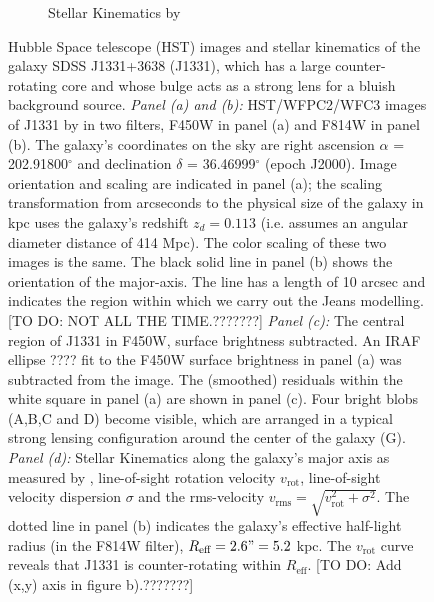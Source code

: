 \begin{figure}
\begin{subfigure}{.5\textwidth}
  \caption{Stellar Kinematics by \citet{SWELLSV}}
  \label{fig:kinematics}
\end{subfigure}
\caption{Hubble Space telescope (HST) images and stellar kinematics of the galaxy SDSS J1331+3638 (J1331), which has a large counter-rotating core and whose bulge acts as a strong lens for a bluish background source. \emph{Panel (a) and (b):} HST/WFPC2/WFC3 images of J1331 by \citet{SWELLSI} in two filters, F450W in panel (a) and F814W in panel (b). The galaxy's coordinates on the sky are right ascension $\alpha$ = 202.91800$^\circ$ and declination $\delta$ = 36.46999$^\circ$ (epoch J2000). Image orientation and scaling are indicated in panel (a); the scaling transformation from arcseconds to the physical size of the galaxy in kpc uses the galaxy's redshift $z_d = 0.113$ \citep{SWELLSIII} (i.e. assumes an angular diameter distance of 414 Mpc). The color scaling of these two images is the same. The black solid line in panel (b) shows the orientation of the major-axis. The line has a length of 10 arcsec and indicates the region within which we carry out the Jeans modelling. [TO DO: NOT ALL THE TIME.???????] \emph{Panel (c):} The central region of J1331 in F450W, surface brightness subtracted. An IRAF ellipse ???? fit to the F450W surface brightness in panel (a) was subtracted from the image. The (smoothed) residuals within the white square in panel (a) are shown in panel (c). Four bright blobs (A,B,C and D) become visible, which are arranged in a typical strong lensing configuration around the center of the galaxy (G). \emph{Panel (d):} Stellar Kinematics along the galaxy's major axis as measured by \citet{SWELLSV}, line-of-sight rotation velocity $v_\text{rot}$, line-of-sight velocity dispersion $\sigma$ and the rms-velocity $v_\text{rms} = \sqrt{v_\text{rot}^2 + \sigma^2}$. The dotted line in panel (b) indicates the galaxy's effective half-light radius (in the F814W filter), $R_\text{eff} = 2.6" = 5.2$ kpc. The $v_\text{rot}$ curve reveals that J1331 is counter-rotating within $R_\text{eff}$. [TO DO: Add (x,y) axis in figure b).???????]}
\label{fig:specialJ1331}
\end{figure}

\clearpage
